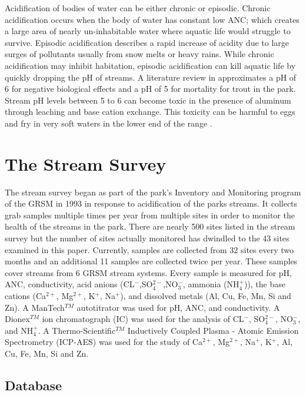 Acidification of bodies of water can be either chronic or episodic. 
Chronic acidification occurs when the body of water has constant low ANC; which creates a large area of  nearly un-inhabitable water where aquatic life would struggle to survive. 
Episodic acidification describes a rapid increase of acidity due to large surges of pollutants usually from snow melts or heavy rains.  
While chronic acidification may inhibit habitation, episodic acidification can kill aquatic life by quickly dropping the pH of streams.
A literature review in \citet{neff2009physiological} approximates a pH of 6 for negative biological effects and a pH of 5 for mortality for trout in the park.  
Stream pH levels between 5 to 6 can become toxic in the presence of aluminum through leaching and base cation exchange.
This toxicity can be harmful to eggs and fry in very soft waters in the lower end of the range \citep{robinson2008ph}.  

\section{The Stream Survey} 

The stream survey began as part of the park's Inventory and Monitoring program of the GRSM in 1993 in response to acidification of the parks streams.
It collects grab samples multiple times per year from multiple sites in order to monitor the health of the streams in the park.
There are nearly 500 sites listed in the stream survey but the number of sites actually monitored has dwindled to the 43 sites examined in this paper.
Currently, samples are collected from 32 sites every two months and an additional 11 samples are collected twice per year.  
These samples cover streams from 6 GRSM stream systems. 
Every sample is  measured for pH, ANC, conductivity, acid anions (CL$^-$,SO$_4^{2-}$,NO$_3^-$, ammonia (NH$_4^+$)), the base cations (Ca$^{2+}$, Mg$^{2+}$, K$^+$, Na$^+$), and dissolved metals (Al, Cu, Fe, Mn, Si and Zn).  
A ManTech$^{TM}$ autotitrator was used for pH, ANC, and conductivity.  
A Dionex$^{TM}$ ion chromatograph (IC) was used for the analysis of CL$^-$, SO$_4^{2-}$, NO$_3^-$, and NH$_4^+$.  
A Thermo-Scientific$^{TM}$ Inductively Coupled Plasma - Atomic Emission Spectrometry (ICP-AES) was used for the study of Ca$^{2+}$, Mg$^{2+}$, Na$^+$, K$^+$, Al, Cu, Fe, Mn, Si and Zn.

\subsection{Database}

